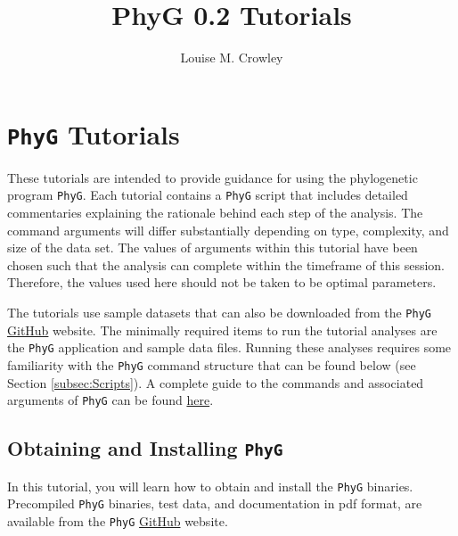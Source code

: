 \documentclass[11pt]{article}
\title{PhyG 0.2 Tutorials}
\author{Louise M. Crowley}
\newcommand{\phyg}{\texttt{PhyG} }
\begin{document}
\maketitle



\section{\phyg Tutorials}

These tutorials are intended to provide guidance for using the phylogenetic 
program \texttt{PhyG}. Each tutorial contains a \phyg script that includes 
detailed commentaries explaining the rationale behind each step of the analysis. 
The command arguments will differ substantially depending on type, complexity, 
and size of the data set. The values of arguments within this tutorial have been 
chosen such that the analysis can complete within the timeframe of this session.
Therefore, the values used here should not be taken to be optimal parameters. 

The tutorials use sample datasets that can also be downloaded from the \texttt{PhyG} 
\href{https://github.com/amnh/PhyGraph}{GitHub} website. The minimally required 
items to run the tutorial analyses are the \phyg application and sample data files. 
Running these analyses requires some familiarity with the \phyg command structure 
that can be found below (see Section \ref{subsec:Scripts}). A complete guide to the
commands and associated arguments of \phyg can be found 
\href{https://github.com/amnh/PhyGraph}{here}.

\subsection{Obtaining and Installing \phyg}
\label{subsec:Installation}

In this tutorial, you will learn how to obtain and install the \phyg binaries.
Precompiled \phyg binaries, test data, and documentation in pdf format, are available 
from the \phyg \href{https://github.com/amnh/PhyGraph}{GitHub} website. 
\end{document}
